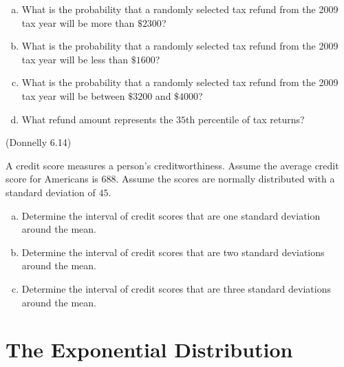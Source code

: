 \documentclass[12pt, letterpaper]{article}
\newcounter{exercise}
\theoremstyle{definition}
\begin{document}
\begin{enumerate}[(a)]

\item What is the probability that a randomly selected tax refund from the 2009 tax year will be more than $\$2300$?

\vfill

\item What is the probability that a randomly selected tax refund from the 2009 tax year will be less than $\$1600$?

\vfill

\item What is the probability that a randomly selected tax refund from the 2009 tax year will be between $\$3200$ and $\$4000$?

\vfill

\item What refund amount represents the $35$th percentile of tax returns?

\vfill

\end{enumerate}


\begin{exercise}  (Donnelly 6.14)

A credit score measures a person's creditworthiness.  Assume the average credit score for Americans is $688$.  Assume the scores are normally distributed with a standard deviation of $45$.

\end{exercise}


\begin{enumerate}[(a)]

\item Determine the interval of credit scores that are one standard deviation around the mean.

\vfill

\item Determine the interval of credit scores that are two standard deviations around the mean.

\vfill

\item Determine the interval of credit scores that are three standard deviations around the mean.

\vfill


\end{enumerate}

\newpage

\section*{The Exponential Distribution}
\end{document}
